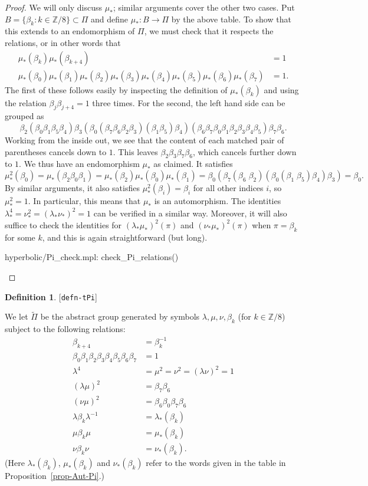 \documentclass[reqno]{amsart}
\newcommand{\lbl}[1]{\label{#1}\textup{[\texttt{#1}]}\par}
\newcommand{\lbl}{\label}
\newcommand{\bt}        {\beta}
\newcommand{\lm}        {\lambda}
\newcommand{\Z}         {{\mathbb{Z}}}
\newcommand{\tPi}	{\widetilde{\Pi}}
\renewcommand{\:}{\colon}
\theoremstyle{definition}
\newtheorem{definition}[theorem]{Definition}
\begin{document}
\begin{proof}
 We will only discuss $\mu_*$; similar arguments cover the other two
 cases.  Put $B=\{\bt_k\:k\in\Z/8\}\subset\Pi$ and define
 $\mu_*\:B\to\Pi$ by the above table.  To show that this extends to an
 endomorphism of $\Pi$, we must check that it respects the relations,
 or in other words that
 \begin{align*}
  \mu_*(\bt_k)\mu_*(\bt_{k+4}) &= 1 \\
  \mu_*(\bt_0)\mu_*(\bt_1)\mu_*(\bt_2)\mu_*(\bt_3)
  \mu_*(\bt_4)\mu_*(\bt_5)\mu_*(\bt_6)\mu_*(\bt_7) &= 1.
 \end{align*}
 The first of these follows easily by inspecting the definition of
 $\mu_*(\bt_k)$ and using the relation $\bt_j\bt_{j+4}=1$ three
 times.  For the second, the left hand side can be grouped as
 \[
     \bt_2(\bt_0\bt_1
     \bt_5\bt_4)\bt_3
     (\bt_0(\bt_7\bt_6
     \bt_2\bt_3)(\bt_1
     \bt_5)\bt_4)(\bt_6
     \bt_7\bt_0\bt_1
     \bt_2\bt_3\bt_4
     \bt_5)\bt_7\bt_6.
 \]
 Working from the inside out, we see that the content of each matched
 pair of parentheses cancels down to $1$.  This leaves
 $\bt_2\bt_3\bt_7\bt_6$, which cancels further down to $1$.  We thus
 have an endomorphism $\mu_*$ as claimed.  It satisfies
 \[ \mu_*^2(\bt_0) = \mu_*(\bt_2\bt_0\bt_1) =
    \mu_*(\bt_2)\mu_*(\bt_0)\mu_*(\bt_1) =
    \bt_0(\bt_7(\bt_6\;\bt_2)(\bt_0(\bt_1\;\bt_5)\bt_4)\bt_3) =
    \bt_0.
 \]
 By similar arguments, it also satisfies $\mu_*^2(\bt_i)=\bt_i$ for
 all other indices $i$, so $\mu_*^2=1$.  In particular, this means
 that $\mu_*$ is an automorphism.  The identities
 $\lm_*^4=\nu_*^2=(\lm_*\nu_*)^2=1$ can be verified in a similar way.
 Moreover, it will also suffice to check the identities for
 $(\lm_*\mu_*)^2(\pi)$ and $(\nu_*\mu_*)^2(\pi)$ when $\pi=\bt_k$ for
 some $k$, and this is again straightforward (but long).
 \begin{checks}
  hyperbolic/Pi_check.mpl: check_Pi_relations()
 \end{checks}
\end{proof}

\begin{definition}\lbl{defn-tPi}
 We let $\tPi$ be the abstract group generated by symbols
 $\lm,\mu,\nu,\bt_k$ (for $k\in\Z/8$) subject to the following relations:
 \begin{align*}
  \bt_{k+4} &= \bt_k^{-1} \\
  \bt_0\bt_1\bt_2\bt_3\bt_4\bt_5\bt_6\bt_7 &= 1 \\
  \lm^4 &= \mu^2 = \nu^2 = (\lm\nu)^2 = 1 \\
  (\lm\mu)^2 &= \bt_7\bt_6 \\
  (\nu\mu)^2 &= \bt_6\bt_0\bt_7\bt_6 \\
  \lm\bt_k\lm^{-1} &= \lm_*(\bt_k) \\
  \mu\bt_k\mu &= \mu_*(\bt_k) \\
  \nu\bt_k\nu &= \nu_*(\bt_k).
 \end{align*}
 (Here $\lm_*(\bt_k)$, $\mu_*(\bt_k)$ and $\nu_*(\bt_k)$ refer to the
 words given in the table in Proposition~\ref{prop-Aut-Pi}.)
\end{definition}
\end{document}
